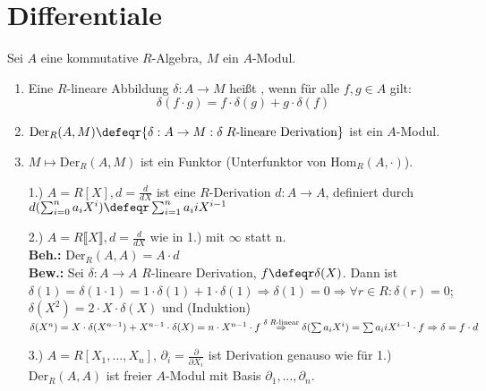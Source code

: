 \section{Differentiale}

\begin{DefBem}
  Sei $A$ eine kommutative $R$-Algebra, $M$ ein $A$-Modul.

  \begin{enumerate}
    \item Eine $R$-lineare Abbildung $\delta: A \to M$ heißt
          , wenn für alle $f,g \in A$ gilt:
          \[\delta(f \cdot g) = f \cdot \delta(g) + g \cdot \delta(f)\]
    \item $\mbox{Der}_R(A,M) \defeqr \{ \delta: A \to M: \delta \;
          R\mbox{-lineare Derivation}\}$ ist ein $A$-Modul.
    \item $M \mapsto \mbox{Der}_R(A,M)$ ist ein Funktor (Unterfunktor von $\mbox{Hom}_R(A,\cdot)$).
  \end{enumerate}
\end{DefBem}

\begin{nnBsp}
  \begin{enumerate}
    \item[1.)] $A = R[X], d = \frac{d}{dX}$ ist eine $R$-Derivation $d: A \to
               A$, definiert durch $d(\sum_{i=0}^n a_i X^i) \defeqr \sum_{i=1}^n a_i
               i X^{i-1}$
    \item[2.)] $A = R \llbracket X \rrbracket, d = \frac{d}{dX}$ wie in 1.) mit
               $\infty$ statt n.\\
               \textbf{Beh.:} $\mbox{Der}_R(A,A) = A \cdot d$\\
               \textbf{Bew.:} Sei $\delta: A \to A$ $R$-lineare Derivation, $f
               \defeqr \delta(X)$. Dann ist $\delta(1) = \delta(1 \cdot 1) =1 
               \cdot \delta(1) + 1 \cdot \delta(1) \Rightarrow \delta(1) = 0
               \Rightarrow \forall r \in R:\delta(r) = 0$; $\delta(X^2) = 2
               \cdot X \cdot \delta(X)$ und (Induktion) $\delta(X^n) = X \cdot
               \delta(X^{n-1}) + X^{n-1} \cdot \delta(X) = n \cdot X^{n-1}\cdot
               f \overset{\scriptsize \delta\; R\mbox{-linear}}{\Rightarrow}
               \delta(\sum a_i X^i) = \sum a_i i X^{i-1} \cdot f \Rightarrow
               \delta = f \cdot d$
    \item[3.)] $A = R[X_1,\dots,X_n]$, $\partial_i = \frac{\partial}{\partial
               X_i}$ ist Derivation genauso wie für 1.) $\mbox{Der}_R(A,A)$ ist
               freier $A$-Modul mit Basis $\partial_1, \dots , \partial_n$.
  \end{enumerate}
\end{nnBsp}

